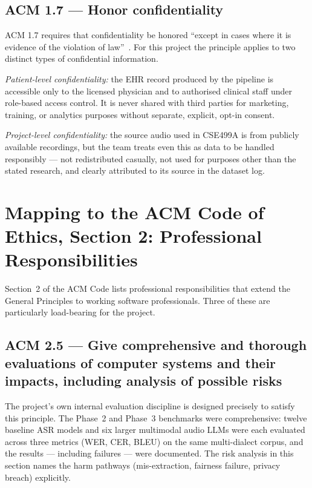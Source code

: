\documentclass[12pt,a4paper]{article}
\begin{document}
\subsection{ACM 1.7 --- Honor confidentiality}

ACM 1.7 requires that confidentiality be honored ``except in cases
where it is evidence of the violation of law''~\cite{eth:acm2018}.
For this project the principle applies to two distinct types of
confidential information.

\textit{Patient-level confidentiality:} the EHR record produced by
the pipeline is accessible only to the licensed physician and to
authorised clinical staff under role-based access control. It is
never shared with third parties for marketing, training, or
analytics purposes without separate, explicit, opt-in consent.

\textit{Project-level confidentiality:} the source audio used in
CSE499A is from publicly available recordings, but the team treats
even this as data to be handled responsibly --- not redistributed
casually, not used for purposes other than the stated research, and
clearly attributed to its source in the dataset log.

\section{Mapping to the ACM Code of Ethics, Section 2:
Professional Responsibilities}

Section~2 of the ACM Code lists professional responsibilities that
extend the General Principles to working software professionals.
Three of these are particularly load-bearing for the project.

\subsection{ACM 2.5 --- Give comprehensive and thorough evaluations
of computer systems and their impacts, including analysis of
possible risks}

The project's own internal evaluation discipline is designed
precisely to satisfy this principle. The Phase~2 and Phase~3
benchmarks were comprehensive: twelve baseline ASR models and six
larger multimodal audio LLMs were each evaluated across three
metrics (WER, CER, BLEU) on the same multi-dialect corpus, and the
results --- including failures --- were documented. The risk
analysis in this section names the harm pathways (mis-extraction,
fairness failure, privacy breach) explicitly.
\end{document}
